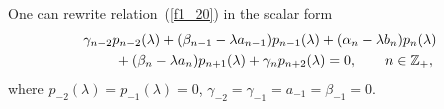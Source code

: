 One can rewrite relation~(\ref{f1_20}) in the scalar form
\begin{gather} \gamma_{n-2} p_{n-2}(\lambda) + (\beta_{n-1}-\lambda a_{n-1}) p_{n-1}(\lambda) + (\alpha_n-\lambda b_n) p_n(\lambda) \notag \\
\qquad{} + (\beta_n-\lambda a_n) p_{n+1}(\lambda) + \gamma_n p_{n+2}(\lambda) = 0,\qquad n\in\mathbb{Z}_+, \label{f1_30}
\end{gather}
where $p_{-2}(\lambda) = p_{-1}(\lambda) = 0$, $\gamma_{-2} = \gamma_{-1} = a_{-1} = \beta_{-1} = 0$.
